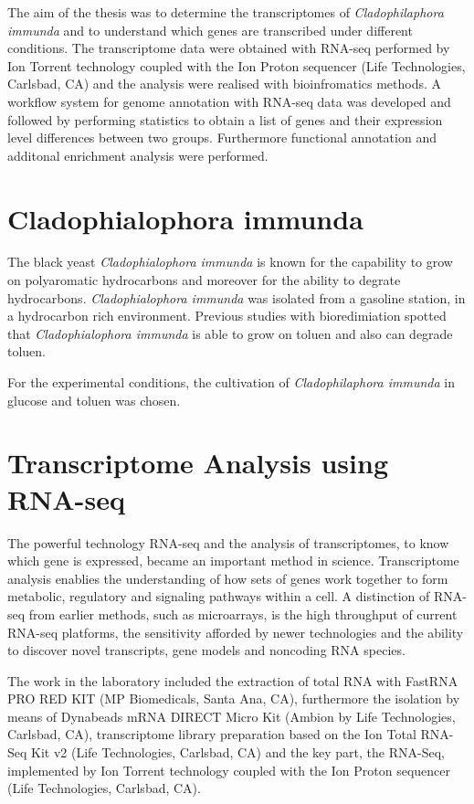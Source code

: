 \documentclass[11pt, a4paper]{report}
\begin{document}
The aim of the thesis was to determine the transcriptomes of \textit{Cladophilaphora immunda}  and to understand which genes are transcribed under different conditions. The transcriptome data were obtained with RNA-seq performed by Ion Torrent technology coupled with the Ion Proton sequencer (Life Technologies, Carlsbad, CA) \cite{Blasi2015} and the analysis were realised with bioinfromatics methods.  
A workflow system for genome annotation with RNA-seq data was developed and followed by performing statistics to obtain a list of genes and their expression level differences between two groups. Furthermore functional annotation and additonal enrichment analysis were performed.

\newpage
\section{Cladophialophora immunda}
The black yeast \textit{Cladophialophora immunda} is known for the capability to grow on polyaromatic hydrocarbons and moreover for the ability to degrate hydrocarbons. \cite{Sterflinger2015} \textit{Cladophialophora immunda} was isolated from a gasoline station, in a hydrocarbon rich environment. Previous studies with bioredimiation spotted that \textit{Cladophialophora immunda} is able to grow on toluen and also can degrade toluen. \cite{Prenafeta-Boldu2001} \cite{Poyntner2014}


For the experimental conditions, the cultivation of \textit{Cladophilaphora immunda} in glucose and toluen was chosen. 


\newpage
\section{Transcriptome Analysis using RNA-seq}
The powerful technology RNA-seq and the analysis of transcriptomes, to know which gene is expressed, became an important method in science. Transcriptome analysis enablies the understanding of how sets of genes work together to form metabolic, regulatory and signaling pathways within a cell. \cite{Xiong2006} A distinction of RNA-seq from earlier methods, such as microarrays, is the high throughput of current RNA-seq platforms, the sensitivity afforded by newer technologies and the ability to discover novel transcripts, gene models and noncoding RNA species. \cite{Korpelainen2014} 

\bigskip
The work in the laboratory included the extraction of total RNA with FastRNA PRO RED KIT (MP Biomedicals, Santa Ana, CA), furthermore the isolation by means of Dynabeads mRNA DIRECT Micro Kit (Ambion by Life Technologies, Carlsbad, CA), transcriptome library preparation based on the Ion Total RNA-Seq Kit v2 (Life Technologies, Carlsbad, CA) and the key part, the RNA-Seq, implemented by Ion Torrent technology coupled with the Ion Proton sequencer (Life Technologies, Carlsbad, CA). \cite{Blasi2015}
\newpage
\end{document}
